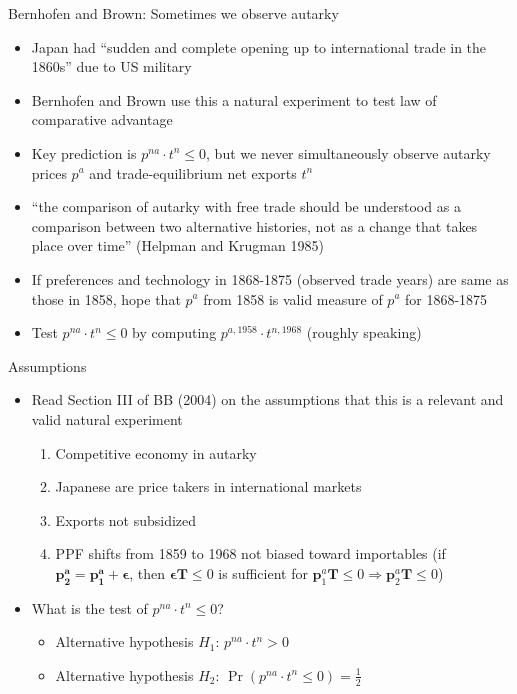 \documentclass[10pt,notes=hide]{beamer}
\begin{document}
\begin{frame}{Bernhofen and Brown: Sometimes we observe autarky}
\begin{itemize}
	\item Japan had ``sudden and complete opening up to international trade in the 1860s'' due to US military
	\item Bernhofen and Brown use this a natural experiment to test law of comparative advantage
	\item Key prediction is $p^{na} \cdot t^n \leq 0$, but we never simultaneously observe autarky prices $p^a$ and trade-equilibrium net exports $t^n$
	\item ``the comparison of autarky with free trade should be understood as a comparison between two alternative histories, not as a change that takes place over time'' (Helpman and Krugman 1985)
	\item If preferences and technology in 1868-1875 (observed trade years) are same as those in 1858, hope that $p^a$ from 1858 is valid measure of $p^a$ for 1868-1875
	\item Test $p^{na} \cdot t^n \leq 0$ by computing $p^{a,1958} \cdot t^{n,1968}$ (roughly speaking)
\end{itemize}
\end{frame}
\begin{frame}{Assumptions}
\begin{itemize}
	\item Read Section III of BB (2004) on the assumptions that this is a relevant and valid natural experiment
	\begin{enumerate}
		\item Competitive economy in autarky
		\item Japanese are price takers in international markets
		\item Exports not subsidized
		\item PPF shifts from 1859 to 1968 not biased toward importables (if $\mathbf{p_2^a} = \mathbf{p_1^a} + \mathbf{\epsilon}$, then $\mathbf{\epsilon} \mathbf{T} \leq 0$ is sufficient for $\mathbf{p}_1^a \mathbf{T}\leq 0 \Rightarrow \mathbf{p}_2^a \mathbf{T}\leq 0$)
	\end{enumerate}
	\item What is the test of $p^{na} \cdot t^n \leq 0$?
	\begin{itemize}
		\item Alternative hypothesis $H_1$: $p^{na} \cdot t^n > 0$
		\item Alternative hypothesis $H_2$: $\Pr\left(p^{na} \cdot t^n \leq 0\right)=\frac{1}{2}$
	\end{itemize}
\end{itemize}
\end{frame}
\end{document}

